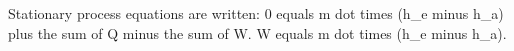 Stationary process equations are written:  
0 equals m dot times (h_e minus h_a) plus the sum of Q minus the sum of W.  
W equals m dot times (h_e minus h_a).